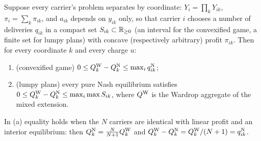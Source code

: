 \begin{theorem}\label{thm:sep}
Suppose every carrier's problem separates by coordinate: $Y_i=\prod_kY_{ik}$, $\pi_i=\sum_k\pi_{ik}$, and $a_{ik}$ depends on $y_{ik}$ only, so that carrier $i$ chooses a number of deliveries $q_{ik}$ in a compact set $S_{ik}\subset\mathbb{R}_{\ge0}$ (an interval for the convexified game, a finite set for lumpy plans) with concave (respectively arbitrary) profit $\pi_{ik}$. Then for every coordinate $k$ and every charge $u$:
\begin{enumerate}
\item[(a)] (convexified game) $0\le Q_k^{\mathrm{W}}-Q_k^{\mathrm{N}}\le\max_iq_{ik}^{\mathrm{N}}$;
\item[(b)] (lumpy plans) every pure Nash equilibrium satisfies $0\le Q_k^{\mathrm{W}}-Q_k^{\mathrm{N}}\le\max_i\max S_{ik}$, where $Q^{\mathrm{W}}$ is the Wardrop aggregate of the mixed extension.
\end{enumerate}
In (a) equality holds when the $N$ carriers are identical with linear profit and an interior equilibrium: then $Q_k^{\mathrm{N}}=\frac{N}{N+1}Q_k^{\mathrm{W}}$ and $Q_k^{\mathrm{W}}-Q_k^{\mathrm{N}}=Q_k^{\mathrm{W}}/(N+1)=q_{ik}^{\mathrm{N}}$.
\end{theorem}
